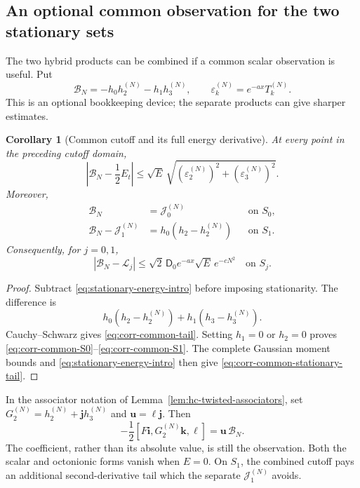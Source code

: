 \documentclass[11pt]{article}
\numberwithin{equation}{section}
\newtheorem{corollary}[theorem]{Corollary}
\theoremstyle{definition}
\theoremstyle{remark}
\newcommand{\ii}{\mathbf i}
\newcommand{\jj}{\mathbf j}
\newcommand{\kk}{\mathbf k}
\newcommand{\Lag}{\mathcal L}
\begin{document}
\subsection{An optional common observation for the two stationary sets}

The two hybrid products can be combined if a common scalar observation
is useful.  Put
\begin{equation}
 \mathcal B_N=-h_0h_2^{(N)}-h_1h_3^{(N)},\qquad
 \varepsilon_k^{(N)}=e^{-ax}T_k^{(N)}.
 \label{eq:corr-common-cutoff}
\end{equation}
This is an optional bookkeeping device; the separate products can
give sharper estimates.

\begin{corollary}[Common cutoff and its full energy derivative]
\label{cor:corr-common-cutoff}
At every point in the preceding cutoff domain,
\begin{equation}
 \left|\mathcal B_N-\frac12E_t\right|
 \le\sqrt E\,
       \sqrt{(\varepsilon_2^{(N)})^2+
                         (\varepsilon_3^{(N)})^2}.
 \label{eq:corr-common-tail}
\end{equation}
Moreover,
\begin{align}
 \mathcal B_N&=\mathcal J_0^{(N)}
                 &&\text{on }S_0,
 \label{eq:corr-common-S0}\\
 \mathcal B_N-\mathcal J_1^{(N)}
    &=h_0(h_2-h_2^{(N)})
                 &&\text{on }S_1.
 \label{eq:corr-common-S1}
\end{align}
Consequently, for \(j=0,1\),
\begin{equation}
 |\mathcal B_N-\Lag_j|
 \le\sqrt2\,\mathsf D_0e^{-ax}\sqrt E\,e^{-cN^2}
                    \quad\text{on }S_j.
 \label{eq:corr-common-stationary-tail}
\end{equation}
\end{corollary}
\begin{proof}
Subtract \eqref{eq:stationary-energy-intro} before imposing
stationarity.  The difference is
\[
 h_0(h_2-h_2^{(N)})+h_1(h_3-h_3^{(N)}).
\]
Cauchy--Schwarz gives \eqref{eq:corr-common-tail}.
Setting \(h_1=0\) or \(h_2=0\) proves
\eqref{eq:corr-common-S0}--\eqref{eq:corr-common-S1}.
The complete Gaussian moment bounds and
\eqref{eq:stationary-energy-intro} then give
\eqref{eq:corr-common-stationary-tail}.
\end{proof}

In the associator notation of
Lemma~\ref{lem:hc-twisted-associators}, set
\(G_2^{(N)}=h_2^{(N)}+\jj h_3^{(N)}\) and
\(\mathbf u=\ell\jj\).  Then
\[
 -\frac12[F\ii,G_2^{(N)}\kk,\ell]=\mathbf u\,\mathcal B_N.
\]
The coefficient, rather than its absolute value, is still the
observation.  Both the scalar and octonionic forms vanish when \(E=0\).
On \(S_1\), the combined cutoff pays an additional second-derivative
tail which the separate \(\mathcal J_1^{(N)}\) avoids.
\end{document}
